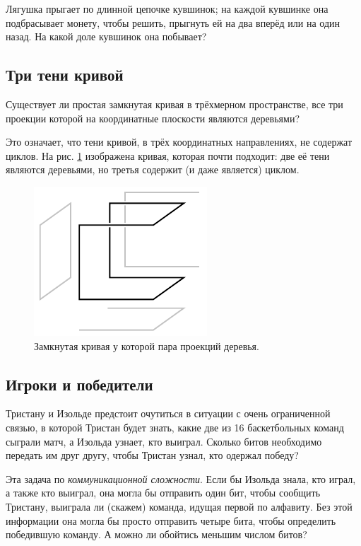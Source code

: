 Лягушка прыгает по длинной цепочке кувшинок;
на каждой кувшинке она подбрасывает монету, чтобы решить, прыгнуть ей на два вперёд или на один назад.
На какой доле кувшинок она побывает?

\subsection*{Три тени кривой}\label{Три тени кривой}

Существует ли простая замкнутая кривая в трёхмерном пространстве, все три проекции которой на координатные плоскости являются деревьями?

Это означает, что тени кривой, в трёх координатных направлениях, не содержат циклов.
На рис. \ref{pic:proj1} изображена кривая, которая почти подходит: две её тени являются деревьями, но третья содержит (и даже является) циклом.

\begin{figure}[htb!]
\centering
\includegraphics[scale=1]{pics/proj1}
\caption{Замкнутая кривая у которой пара проекций деревья.}
\label{pic:proj1}
\end{figure}

\subsection*{Игроки и победители}

Тристану и Изольде предстоит очутиться в ситуации с очень ограниченной связью, в которой Тристан будет знать, какие две из 16 баскетбольных команд сыграли матч, а Изольда узнает, кто выиграл.
Сколько битов необходимо передать им друг другу, чтобы Тристан узнал, кто одержал победу?

Эта задача по \emph{коммуникационной сложности}.
Если бы Изольда знала, кто играл, а также кто выиграл, она могла бы отправить один бит, чтобы сообщить Тристану, выиграла ли (скажем) команда, идущая первой по алфавиту.
Без этой информации она могла бы просто отправить четыре бита, чтобы определить победившую команду.
А можно ли обойтись меньшим числом битов?


